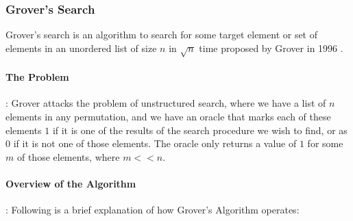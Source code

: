 \subsubsection{Grover's Search}

Grover's search is an algorithm to search for some target element or set of elements in an unordered list of size $n$ in $\sqrt{n}$ time proposed by Grover in 1996 \cite{grover-search-original}.

\paragraph*{The Problem}: Grover attacks the problem of unstructured search, where we have a list of $n$ elements in any permutation, and we have an oracle that marks each of these elements $1$ if it is one of the results of the search procedure we wish to find, or as $0$ if it is not one of those elements. The oracle only returns a value of $1$ for some $m$ of those elements, where $m << n$.

\paragraph*{Overview of the Algorithm}: Following is a brief explanation of how Grover's Algorithm operates:

